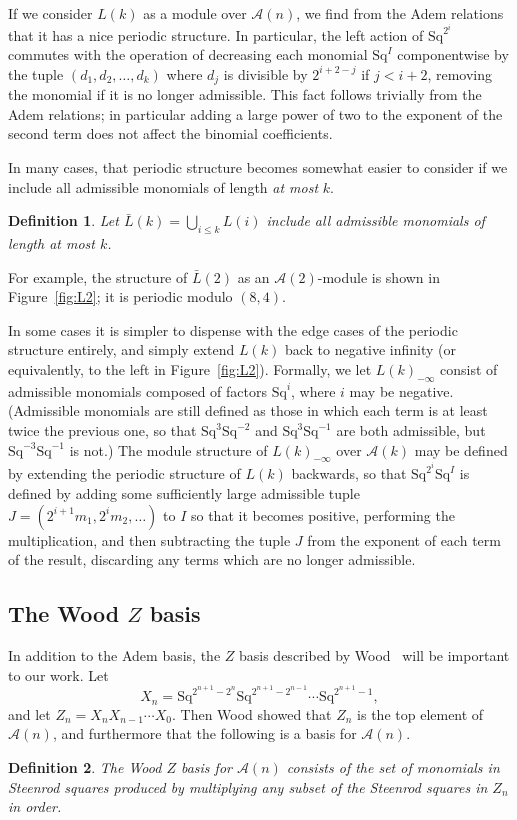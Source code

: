 \documentclass{article}
\newcommand{\A}{\mathcal{A}}
\newcommand{\Sq}{\mathrm{Sq}}
\renewcommand{\L}{\bar{L}}
\newcommand{\Lkm}[1][k]{L{(#1)}_{-\infty}}
\newtheorem{defn}{Definition}
\begin{document}
If we consider $L(k)$ as a module over $\A(n)$, we find from the Adem relations that it has a nice periodic structure.  In particular, the left action of $\Sq^{2^i}$ commutes with the operation of decreasing each monomial $\Sq^I$ componentwise by the tuple $(d_1, d_2, \ldots, d_k)$ where $d_j$ is divisible by $2^{i+2-j}$ if $j<i+2$, removing the monomial if it is no longer admissible.  This fact follows trivially from the Adem relations; in particular adding a large power of two to the exponent of the second term does not affect the binomial coefficients.

In many cases, that periodic structure becomes somewhat easier to consider if we include all admissible monomials of length \emph{at most} $k$.
\begin{defn}
  Let $\L(k)=\bigcup_{i\leq k}L(i)$ include all admissible monomials of length \emph{at most} $k$.
\end{defn}

For example, the structure of $\L(2)$ as an $\A(2)$-module is shown in Figure~\ref{fig:L2}; it is periodic modulo $(8, 4)$.

In some cases it is simpler to dispense with the edge cases of the periodic structure entirely, and simply extend $L(k)$ back to negative infinity (or equivalently, to the left in Figure~\ref{fig:L2}).  Formally, we let $\Lkm$ consist of admissible monomials composed of factors $\Sq^i$, where $i$ may be negative.  (Admissible monomials are still defined as those in which each term is at least twice the previous one, so that $\Sq^3\Sq^{-2}$ and $\Sq^3\Sq^{-1}$ are both admissible, but $\Sq^{-3}\Sq^{-1}$ is not.)  The module structure of $\Lkm$ over $\A(k)$ may be defined by extending the periodic structure of $L(k)$ backwards, so that $\Sq^{2^i}\Sq^I$ is defined by adding some sufficiently large admissible tuple $J=(2^{i+1}m_1, 2^im_2, \ldots)$ to $I$ so that it becomes positive, performing the multiplication, and then subtracting the tuple $J$ from the exponent of each term of the result, discarding any terms which are no longer admissible.


\subsection{The Wood \boldmath$Z$ basis}
In addition to the Adem basis, the $Z$ basis described by Wood~\cite{TODO} will be important to our work.  Let
\[ X_n = \Sq^{2^{n+1}-2^n}\Sq^{2^{n+1}-2^{n-1}}\cdots\Sq^{2^{n+1}-1}, \]
and let $Z_n = X_n X_{n-1}\cdots X_0$.  Then Wood showed that $Z_n$ is the top element of $\A(n)$, and furthermore that the following is a basis for $\A(n)$.
\begin{defn}
  The Wood $Z$ basis for $\A(n)$ consists of the set of monomials in Steenrod squares produced by multiplying any subset of the Steenrod squares in $Z_n$ in order.
\end{defn}
\end{document}
